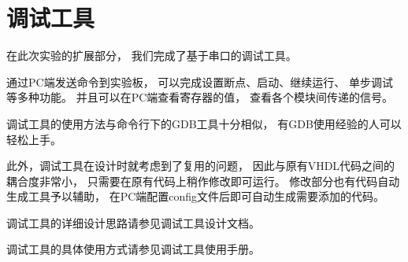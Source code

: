 \section{调试工具}
    在此次实验的扩展部分，%
    我们完成了基于串口的调试工具。

    通过PC端发送命令到实验板，%
    可以完成设置断点、启动、继续运行、%
    单步调试等多种功能。%
    并且可以在PC端查看寄存器的值，%
    查看各个模块间传递的信号。

    调试工具的使用方法与命令行下的GDB工具十分相似，%
    有GDB使用经验的人可以轻松上手。

    此外，调试工具在设计时就考虑到了复用的问题，%
    因此与原有VHDL代码之间的耦合度非常小，%
    只需要在原有代码上稍作修改即可运行。%
    修改部分也有代码自动生成工具予以辅助，%
    在PC端配置config文件后即可自动生成需要添加的代码。%

    调试工具的详细设计思路请参见调试工具设计文档。
    
    调试工具的具体使用方式请参见调试工具使用手册。
